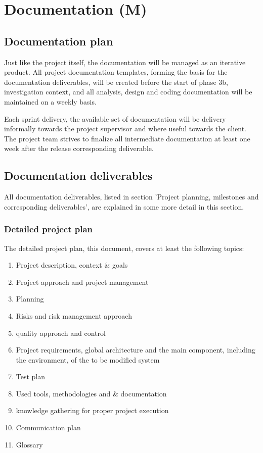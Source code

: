 
\section{Documentation (M)}
\label{sec:documentation}
\subsection{Documentation plan}
%
Just like the project itself, the documentation will be managed as an iterative product. 
All project documentation templates, forming the basis for the documentation deliverables, will be created before the start of phase 3b, investigation context, and all analysis, design and  coding documentation will be maintained on a weekly basis.

Each sprint delivery, the available set of documentation will be delivery informally towards the project supervisor and where useful towards the client.
The project team strives to finalize all intermediate documentation at least one week after the release corresponding deliverable.

\subsection{Documentation deliverables}

All documentation deliverables, listed in section 'Project planning, milestones and corresponding deliverables', are explained in some more detail in this section.

\subsubsection{Detailed project plan}
The detailed project plan, this document, covers at least the following topics:

 	\begin{enumerate}
		\item Project description, context \& goals
		\item Project approach and project management
		\item Planning
		\item Risks and risk management approach
		\item quality approach and control
		\item Project requirements, global architecture and the main component, including the environment, of the to be modified system
		\item Test plan
		\item Used tools, methodologies and \& documentation
		\item knowledge gathering for proper project execution
		\item Communication plan
		\item Glossary
	\end {enumerate}

